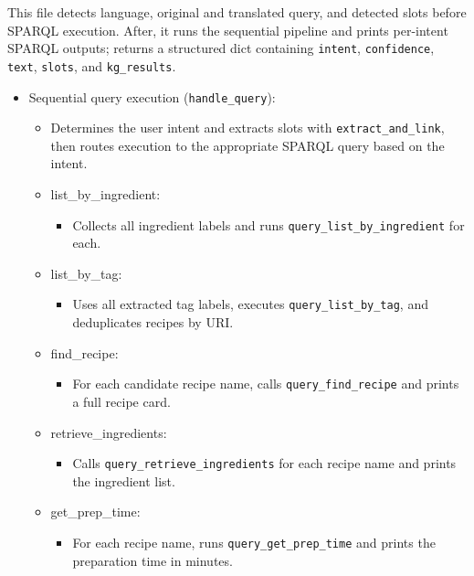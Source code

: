 \documentclass[conference]{IEEEtran}
\begin{document}
This file detects language, original and translated query, and detected slots before SPARQL execution.
After, it runs the sequential pipeline and prints per-intent SPARQL outputs; returns a structured dict containing \texttt{intent}, \texttt{confidence}, \texttt{text}, \texttt{slots}, and \texttt{kg\_results}.
\begin{itemize}

  \item Sequential query execution (\texttt{handle\_query}):
    \begin{itemize}
      \item Determines the user intent and extracts slots with \texttt{extract\_and\_link}, then routes execution to the appropriate SPARQL query based on the intent.

      \item list\_by\_ingredient:
        \begin{itemize}
          \item Collects all ingredient labels and runs \texttt{query\_list\_by\_ingredient} for each.
        \end{itemize}

      \item list\_by\_tag:
        \begin{itemize}
          \item Uses all extracted tag labels, executes \texttt{query\_list\_by\_tag}, and deduplicates recipes by URI.
        \end{itemize}

      \item find\_recipe:
        \begin{itemize}
          \item For each candidate recipe name, calls \texttt{query\_find\_recipe} and prints a full recipe card.
        \end{itemize}

      \item retrieve\_ingredients:
        \begin{itemize}
          \item Calls \texttt{query\_retrieve\_ingredients} for each recipe name and prints the ingredient list.
        \end{itemize}

      \item get\_prep\_time:
        \begin{itemize}
          \item For each recipe name, runs \texttt{query\_get\_prep\_time} and prints the preparation time in minutes.
        \end{itemize}


\end{itemize}
\end{itemize}
\end{document}
